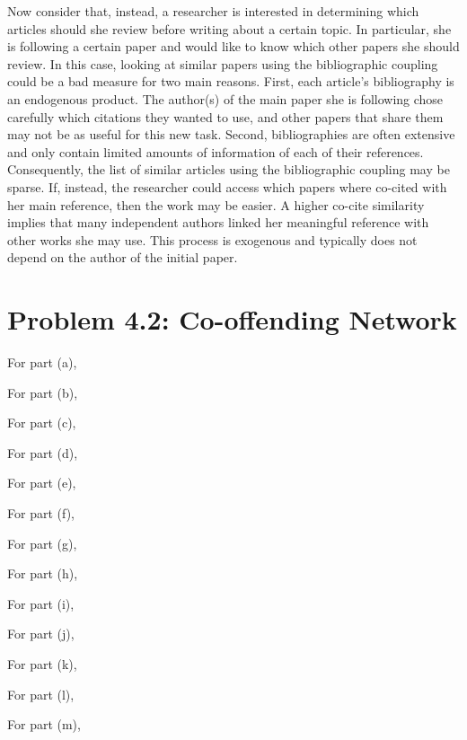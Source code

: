 \documentclass[11pt, english]{article}
\begin{document}
\begin{multicols}{2}
Now consider that, instead, a researcher is interested in determining which articles should she review before writing about a certain topic. In particular, she is following a certain paper and would like to know which other papers she should review. In this case, looking at similar papers using the bibliographic coupling could be a bad measure for two main reasons. First, each article's bibliography is an endogenous product. The author(s) of the main paper she is following chose carefully which citations they wanted to use, and other papers that share them may not be as useful for this new task. Second, bibliographies are often extensive and only contain limited amounts of information of each of their references. Consequently, the list of similar articles using the bibliographic coupling may be sparse. If, instead, the researcher could access which papers where co-cited with her main reference, then the work may be easier. A higher co-cite similarity implies that many independent authors linked her meaningful reference with other works she may use. This process is exogenous and typically does not depend on the author of the initial paper.

\section*{Problem 4.2: Co-offending Network}

For part (a),

For part (b),

For part (c),

For part (d),

For part (e),

For part (f),

For part (g),

For part (h),

For part (i),

For part (j),

For part (k),

For part (l),

For part (m),
  

\end{multicols}
\end{document}
